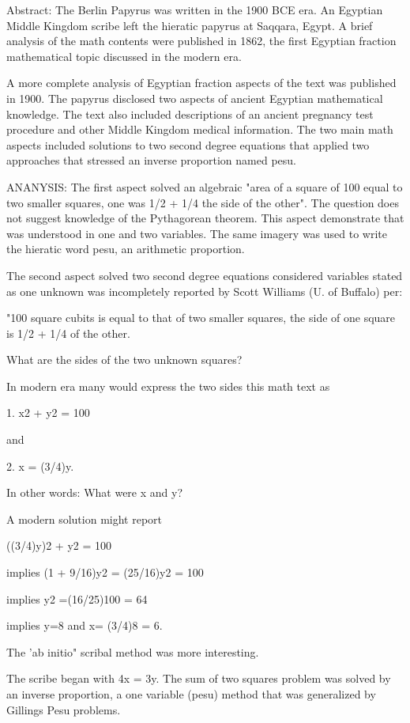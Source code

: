 \documentclass[12pt]{article}
\begin{document}
Abstract: The Berlin Papyrus was written in the 1900 BCE era. An Egyptian Middle Kingdom scribe left the hieratic papyrus at Saqqara, Egypt. A brief analysis of the math contents were published in 1862, the first Egyptian fraction mathematical topic discussed in the modern era. 

A more complete analysis of Egyptian fraction aspects of the text was published in 1900. The papyrus disclosed two aspects of ancient Egyptian mathematical knowledge. The text also included descriptions of an ancient pregnancy test procedure and other Middle Kingdom medical information. The two main math aspects included solutions to two second degree equations that applied two approaches that stressed an inverse proportion named pesu.

ANANYSIS: The first aspect solved an algebraic "area of a square of 100 equal to two smaller squares,  one was 1/2 + 1/4 the side of the other". The question does not suggest knowledge of the Pythagorean theorem. This aspect demonstrate that  was understood in one and two variables. The same imagery was used to write the hieratic word  pesu,  an arithmetic proportion. 

The second aspect solved two second degree equations considered variables stated as one unknown  was incompletely reported by Scott Williams (U. of Buffalo) per:

"100 square cubits is equal to that of two smaller squares, the side of one square is 1/2 + 1/4 of the other. 

What are the sides of the two unknown squares?

In modern era many would express the two sides this math text as 

1. x2 + y2 = 100 

and 

2. x = (3/4)y. 

In other words: What were x and y?

A modern solution might report 

((3/4)y)2 + y2 = 100 

implies (1 + 9/16)y2 = (25/16)y2 = 100 

implies y2 =(16/25)100 = 64 

implies y=8 and x= (3/4)8 = 6.

The 'ab initio" scribal method was more interesting. 

The scribe began with 4x = 3y.  The sum of two squares problem was solved by an inverse proportion, a one variable (pesu) method that was generalized by Gillings Pesu problems. 
\end{document}
